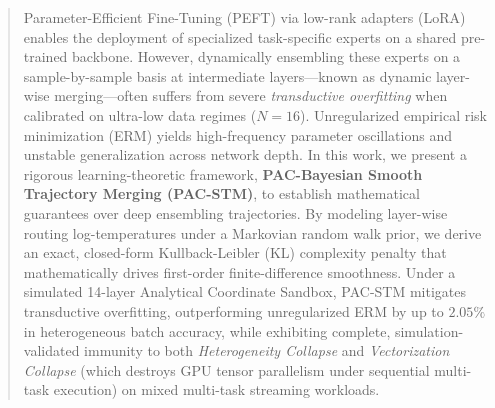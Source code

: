 \begin{abstract}
Parameter-Efficient Fine-Tuning (PEFT) via low-rank adapters (LoRA) enables the deployment of specialized task-specific experts on a shared pre-trained backbone. However, dynamically ensembling these experts on a sample-by-sample basis at intermediate layers---known as dynamic layer-wise merging---often suffers from severe \emph{transductive overfitting} when calibrated on ultra-low data regimes ($N = 16$). Unregularized empirical risk minimization (ERM) yields high-frequency parameter oscillations and unstable generalization across network depth. 
In this work, we present a rigorous learning-theoretic framework, \textbf{PAC-Bayesian Smooth Trajectory Merging (PAC-STM)}, to establish mathematical guarantees over deep ensembling trajectories. By modeling layer-wise routing log-temperatures under a Markovian random walk prior, we derive an exact, closed-form Kullback-Leibler (KL) complexity penalty that mathematically drives first-order finite-difference smoothness. 
Under a simulated 14-layer Analytical Coordinate Sandbox, PAC-STM mitigates transductive overfitting, outperforming unregularized ERM by up to $2.05\%$ in heterogeneous batch accuracy, while exhibiting complete, simulation-validated immunity to both \emph{Heterogeneity Collapse} and \emph{Vectorization Collapse} (which destroys GPU tensor parallelism under sequential multi-task execution) on mixed multi-task streaming workloads.
\end{abstract}

